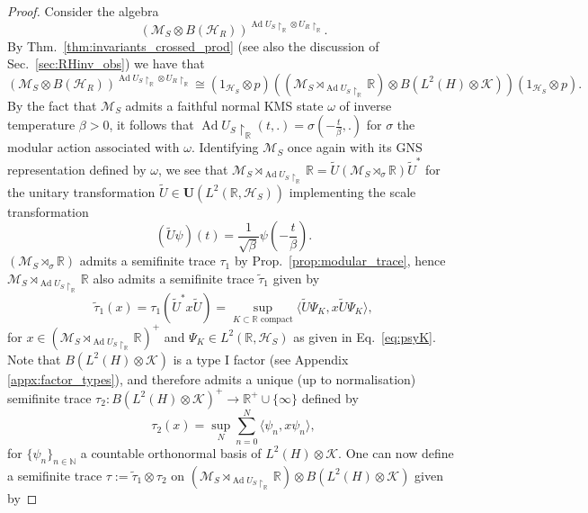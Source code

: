 \documentclass[sn-mathphys-num]{sn-jnl}%
\newcommand{\RR}{\mathbb{R}}
\newcommand{\HH}{\mathcal{H}}
\newcommand{\KK}{\mathcal{K}}
\newcommand{\MM}{\mathcal{M}}
\DeclareMathOperator{\Ad}{Ad}
\numberwithin{equation}{section}
\theoremstyle{thmstyleone}%
\theoremstyle{thmstyletwo}%
\theoremstyle{thmstylethree}%
\begin{document}
\begin{proof}
    Consider the algebra
    \begin{equation}
        (\MM_S\otimes B(\HH_R))^{\Ad U_S\restriction_\RR\otimes U_R\restriction_\RR}.
    \end{equation}
    By Thm.\ \ref{thm:invariants_crossed_prod} (see also the discussion of Sec.\ \ref{sec:RHinv_obs}) we have that 
    \begin{equation}
    \label{eq:fixed_point_iso}
        (\MM_S\otimes B(\HH_R))^{\Ad U_S\restriction_\RR\otimes U_R\restriction_\RR}\cong (1_{\HH_S}\otimes p)((\MM_S\rtimes_{\Ad U_S\restriction_\RR}\RR)\otimes B(L^2(H)\otimes\KK))(1_{\HH_S}\otimes p).
    \end{equation}
    By the fact that $\MM_S$ admits a faithful normal KMS state $\omega$ of inverse temperature $\beta>0$, it follows that $\Ad U_S\restriction_\RR(t,.)=\sigma(-\frac{t}{\beta},.)$ for $\sigma$ the modular action associated with $\omega$. Identifying $\MM_S$ once again with its GNS representation defined by $\omega$, we see that $\MM_S\rtimes_{\Ad U_S\restriction_\RR}\RR= \tilde{U}(\MM_S\rtimes_\sigma\RR)\tilde{U}^*$ for the unitary transformation $\tilde{U}\in\mathbf{U}(L^2(\RR,\HH_S))$ implementing the scale transformation
    \begin{equation}
        (\tilde{U}\psi)(t)=\frac{1}{\sqrt{\beta}}\psi\left(-\frac{t}{\beta}\right).
    \end{equation}
    $(\MM_S\rtimes_\sigma\RR)$ admits a semifinite trace $\tau_1$  by Prop.\ \ref{prop:modular_trace}, hence $\MM_S\rtimes_{\Ad U_S\restriction_\RR}\RR$ also admits a semifinite trace $\tilde{\tau}_1$ given by
    \begin{equation}
        \tilde{\tau}_1(x)=\tau_1(\tilde{U}^*x\tilde{U})=\sup_{K\subset\RR\text{ compact}}\langle\tilde{U}\Psi_K,x\tilde{U}\Psi_K\rangle,
    \end{equation}
    for $x\in (\MM_S\rtimes_{\Ad U_S\restriction_\RR}\RR)^+$ and $\Psi_K\in L^2(\RR,\HH_S)$ as given in Eq.\ \eqref{eq:psyK}.
    Note that $B(L^2(H)\otimes\KK)$ is a type I factor (see Appendix \ref{appx:factor_types}), and therefore admits a unique (up to normalisation) semifinite trace $\tau_2:B(L^2(H)\otimes\KK)^+\to\RR^+\cup\{\infty\}$ defined by
    \begin{equation}\tau_2(x)=\sup_N\sum_{n=0}^N\langle \psi_n,x\psi_n\rangle,\end{equation}
    for $\{\psi_n\}_{n\in \mathbb{N}}$ a countable orthonormal basis of $L^2(H)\otimes\KK$. One can now define a semifinite trace $\tau:=\tilde{\tau}_1\otimes\tau_2$ on $(\MM_S\rtimes_{\Ad U_S\restriction_\RR}\RR)\otimes B(L^2(H)\otimes\KK)$ given by

\end{proof}
\end{document}

